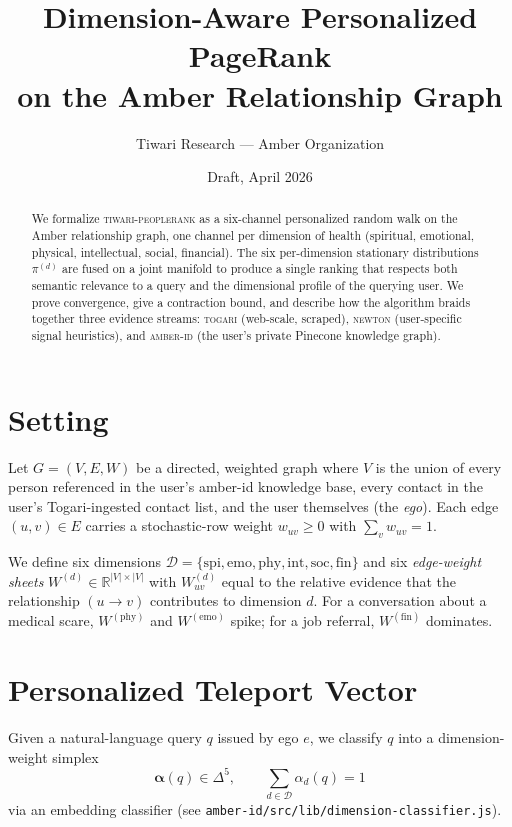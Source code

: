 \documentclass[11pt]{article}
\title{\textbf{Dimension-Aware Personalized PageRank \\ on the Amber Relationship Graph}}
\author{Tiwari Research --- Amber Organization}
\date{Draft, April 2026}
\begin{document}
\maketitle

\begin{abstract}
We formalize \textsc{tiwari-peoplerank} as a six-channel
personalized random walk on the Amber relationship graph, one channel
per dimension of health (spiritual, emotional, physical, intellectual,
social, financial). The six per-dimension stationary distributions
$\pi^{(d)}$ are fused on a joint manifold to produce a single ranking
that respects both semantic relevance to a query and the dimensional
profile of the querying user. We prove convergence, give a contraction
bound, and describe how the algorithm braids together three evidence
streams: \textsc{togari} (web-scale, scraped), \textsc{newton}
(user-specific signal heuristics), and \textsc{amber-id} (the user's
private Pinecone knowledge graph).
\end{abstract}

\section{Setting}

Let $G = (V, E, W)$ be a directed, weighted graph where
$V$ is the union of every person referenced in the user's amber-id
knowledge base, every contact in the user's Togari-ingested contact
list, and the user themselves (the \emph{ego}).
Each edge $(u,v)\in E$ carries a stochastic-row weight
$w_{uv}\ge 0$ with $\sum_v w_{uv} = 1$.

We define six dimensions
$\mathcal{D} = \{\text{spi},\text{emo},\text{phy},\text{int},\text{soc},\text{fin}\}$
and six \emph{edge-weight sheets} $W^{(d)}\in\mathbb{R}^{|V|\times|V|}$
with $W^{(d)}_{uv}$ equal to the relative evidence that the
relationship $(u\to v)$ contributes to dimension $d$. For a
conversation about a medical scare, $W^{(\text{phy})}$ and
$W^{(\text{emo})}$ spike; for a job referral, $W^{(\text{fin})}$
dominates.

\section{Personalized Teleport Vector}

Given a natural-language query $q$ issued by ego $e$, we classify $q$
into a dimension-weight simplex
\[
\bm{\alpha}(q) \in \Delta^5, \qquad \sum_{d\in\mathcal{D}} \alpha_d(q) = 1
\]
via an embedding classifier (see \texttt{amber-id/src/lib/dimension-classifier.js}).
\end{document}
